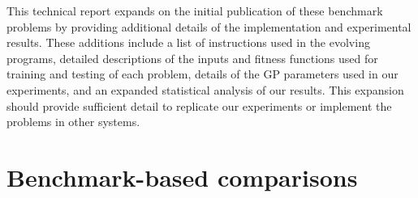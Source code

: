 \documentclass{sig-alternate}
\begin{document}
This technical report expands on the initial publication of these benchmark problems \cite{Helmuth:2015:GECCO} by providing additional details of the implementation and experimental results. These additions include a list of instructions used in the evolving programs, detailed descriptions of the inputs and fitness functions used for training and testing of each problem, details of the GP parameters used in our experiments, and an expanded statistical analysis of our results. This expansion should provide sufficient detail to replicate our experiments or implement the problems in other systems.







\section{Benchmark-based comparisons}
\end{document}
